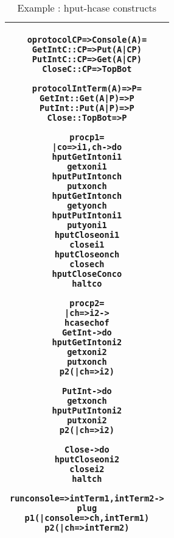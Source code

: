 \documentclass[11pt]{article}
\newcommand{\<}{\langle}
\renewcommand{\>}{\rangle}
\begin{document}
\begin{table}
\begin{center}
\begin{tabular}{|c|} \hline
\begin{minipage}{3.2in}
{
\begin{alltt}

oprotocol CP => Console (A) =
    GetIntC   :: CP => Put (A|CP)  
    PutIntC   :: CP => Get (A|CP) 
    CloseC    :: CP => TopBot  

protocol IntTerm (A) => P =
    GetInt   :: Get (A|P) => P 
    PutInt   :: Put (A|P) => P
    Close    :: TopBot    => P  

proc p1 = 
    | co => i1,ch -> do 
        hput GetInt on i1 
        get x on i1 
        hput PutInt on ch 
        put x on ch 
        hput GetInt on ch 
        get y on ch 
        hput PutInt on i1 
        put y on i1 
        hput Close on i1 
        close i1 
        hput Close on ch 
        close ch 
        hput CloseC on co 
        halt co 

proc p2 = 
    | ch => i2 -> 
        hcase ch of 
            GetInt -> do 
                hput GetInt on i2  
                get x on i2 
                put x on ch 
                p2 ( | ch => i2)

            PutInt -> do 
                get x on ch 
                hput PutInt on i2 
                put x on i2
                p2 ( | ch => i2)

            Close  -> do 
                hput Close on i2 
                close i2
                halt ch 

run console => intTerm1,intTerm2 -> 
      plug 
         p1 ( | console => ch,intTerm1)
         p2 ( | ch => intTerm2)
 
\end{alltt}

} 
\end {minipage} 
\tabularnewline
\hline
\end{tabular}
\caption{Example : {\sf hput-hcase} constructs}
\label{Conc : hcaseExample}
\end{center}
\end{table}
\end{document}
